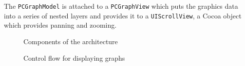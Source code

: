 The \texttt{PCGraphModel} is attached to a \texttt{PCGraphView} which puts the
graphics data into a series of nested layers and provides it to a
\texttt{UIScrollView}, a Cocoa object which provides panning and zooming.


\begin{figure}[p]
    \caption{\label{fig:maw_components} Components of the architecture}
\end{figure}

\begin{figure}[htbp]
    \caption{\label{fig:maw_controlflow} Control flow for displaying graphs}
\end{figure}

